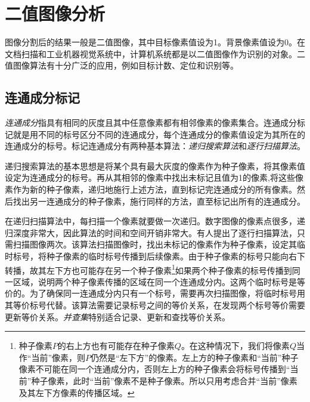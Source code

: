\section{二值图像分析}

图像分割后的结果一般是二值图像，其中目标像素值设为1。背景像素值设为0。在文档扫描和工业机器视觉系统中，计算机系统都是以二值图像作为识别的对象。二值图像算法有十分广泛的应用，例如目标计数、定位和识别等。

\subsection{连通成分标记}\label{sec:comp}

\emph{连通成分}指具有相同的灰度且其中任意像素都有相邻像素的像素集合。连通成分标记就是用不同的标号区分不同的连通成分，每个连通成分的像素值设定为其所在的连通成分的标号。标记连通成分有两种基本算法：\emph{递归搜索算法}和\emph{逐行扫描算法}。

递归搜索算法的基本思想是将某个具有最大灰度的像素作为种子像素，将其像素值设定为连通成分的标号。再从其相邻的像素中找出未标记且值为1的像素,将这些像素作为新的种子像素，递归地施行上述方法，直到标记完连通成分的所有像素。然后找出另一连通成分的种子像素，施行同样的方法，直至标记出所有的连通成分。%

在递归扫描算法中，每扫描一个像素就要做一次递归。数字图像的像素点很多，递归深度非常大，因此算法的时间和空间开销非常大。有人提出了逐行扫描算法，只需扫描图像两次。该算法扫描图像时，找出未标记的像素作为种子像素，设定其临时标号，将种子像素的临时标号传播到后续像素。由于种子像素的标号只能向右下转播，故其左下方也可能存在另一个种子像素\footnote{种子像素$P$的右上方也有可能存在种子像素$Q$。在这种情况下，我们将像素$Q$当作“当前”像素，则$P$仍然是“左下方”的像素。左上方的种子像素和“当前”种子像素不可能在同一个连通成分内，否则左上方的种子像素会将标号传播到“当前”种子像素，此时“当前”像素不是种子像素。所以只用考虑合并“当前”像素及其左下方像素的传播区域。}如果两个种子像素的标号传播到同一区域，说明两个种子像素传播的区域在同一个连通成分内。这两个临时标号是等价的。为了确保同一连通成分内只有一个标号，需要再次扫描图像，将临时标号用其等价标号代替。该算法需要记录标号之间的等价关系，在发现两个标号等价需要更新等价关系。\emph{并查集}特别适合记录、更新和查找等价关系。

